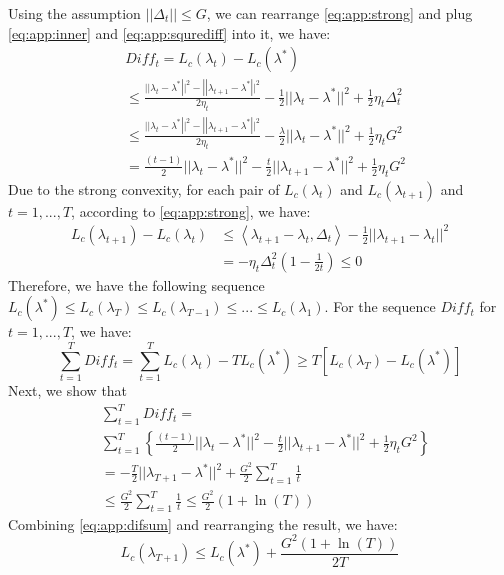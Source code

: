 	Using the assumption $||\Delta_t|| \leq G$, we can rearrange \eqref{eq:app:strong} and plug \eqref{eq:app:inner} and \eqref{eq:app:squrediff} into it, we have:	
	\begin{equation}\label{eq:app:it_diff}
	\begin{aligned}
	&{Diff}_t = L_c(\lambda_t)-L_c(\lambda^*)\\
	 &\leq \frac{{||{\lambda _t} - {\lambda ^*}|{|^2} - ||{\lambda _{t + 1}} - {\lambda ^*}|{|^2}}}{{2{\eta _t}}} - \frac{1 }{2}||{\lambda _t} - {\lambda ^*}|{|^2} + \frac{1}{2}{\eta _t}\Delta _t^2 \\
	&\leq \frac{{||{\lambda _t} - {\lambda ^*}|{|^2} - ||{\lambda _{t + 1}} - {\lambda ^*}|{|^2}}}{{2{\eta _t}}} - \frac{\lambda }{2}||{\lambda _t} - {\lambda ^*}|{|^2} + \frac{1}{2}{\eta _t} G^2\\
	&=\frac{ (t-1)}{2}{||{\lambda _t} - {\lambda ^*}||^2}- \frac{ t}{2}{||{\lambda _{t+1}} - {\lambda ^*}||^2}+\frac{1}{2}{\eta _t} G^2
	\end{aligned}
	\end{equation}	
	Due to the strong convexity, for each pair of $L_c(\lambda_t)$ and $L_c(\lambda_{t+1})$ and $t=1,...,T$, according to \eqref{eq:app:strong}, we have:	
	\begin{equation}
	\begin{aligned}
	L_c({\lambda _{t + 1}}) - L_c({\lambda _t}) &\le \left\langle {{\lambda _{t + 1}} - {\lambda _t},{\Delta _t}} \right\rangle  - \frac{1 }{2}||{\lambda _{t + 1}} -\lambda_t |{|^2} \\
	&=  - \eta_t\Delta _t^2 (1-\frac{1}{2t}) \leq 0
	\end{aligned}
	\end{equation}
	Therefore, we have the following sequence $L_c(\lambda^*) \leq L_c(\lambda_T) \leq L_c(\lambda_{T-1}) \leq...\leq L_c(\lambda_1)$. 
	For the sequence $Diff_t$ for $t=1,...,T$, we have:	
	\begin{equation} \label{eq:app:difsum}
	\sum_{t=1}^{T} Diff_t =  \sum_{t=1}^{T}L_c(\lambda_t)-TL_c(\lambda^*) \geq T\left[L_c(\lambda_T)-L_c(\lambda^*)\right]
	\end{equation}	
	Next, we show that 	
	\begin{equation}
	\begin{aligned}
	&\sum_{t=1}^{T} Diff_t =\\
	&\sum_{t=1}^{T}\left\{\frac{(t-1)}{2}{||{\lambda _t} - {\lambda ^*}||^2}- \frac{t}{2}{||{\lambda _{t+1}} - {\lambda ^*}||^2}+\frac{1}{2}{\eta _t} G^2\right\} \\
	&=-\frac{T}{2}{||{\lambda _{T+1}-\lambda^*}||^2} + \frac{G^2}{2}\sum_{t=1}^{T} \frac{1}{t}\\
	&\leq \frac{G^2}{2}\sum_{t=1}^{T} \frac{1}{t} \leq \frac{G^2}{2}(1+\ln(T))
	\end{aligned}
	\end{equation}	
	Combining \eqref{eq:app:difsum} and rearranging the result, we have:
	\begin{equation*}
	L_c(\lambda_{T+1}) \leq L_c(\lambda^*)+\frac{G^2(1+\ln (T))}{2T}
	\end{equation*}
